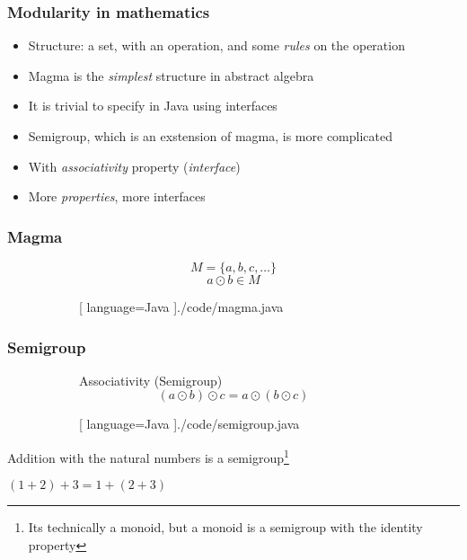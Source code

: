 \begin{frame}
  \frametitle{Modularity in mathematics}
  \begin{itemize}
    \item Structure: a set, with an operation, and some \textit{rules} on the
    operation
    \item Magma is the \textit{simplest} structure in abstract algebra
    \item It is trivial to specify in Java using interfaces
    \item Semigroup, which is an exstension of magma, is more complicated
    \item With \textit{associativity} property (\textit{interface})
    \item More \textit{properties}, more interfaces
  \end{itemize}
\end{frame}

\begin{frame}
  \frametitle{Magma}
  \begin{figure}[H]
    \begin{subfigure}[h]{0.45\textwidth}
      \begin{equation}
        M = \{ a, b, c, \dots \}
      \end{equation}
      \begin{equation}
        a \odot b \in M
      \end{equation}
    \end{subfigure}
    \hfill
    \begin{subfigure}[h]{0.45\textwidth}
      \begin{center}
      
      [ language=Java
      ]{./code/magma.java}
  \end{center}
    \end{subfigure}
  \end{figure}
\end{frame}

\hidelogo

\begin{frame}
  \frametitle{Semigroup}
  \begin{figure}[H]
    \begin{subfigure}[h]{0.45\textwidth}
      Associativity (Semigroup)
      \begin{equation}
        (a \odot b) \odot c = a \odot (b \odot c)
      \end{equation}
    \end{subfigure}
    \hfill
    \begin{subfigure}[h]{0.45\textwidth}
      \begin{center}
        
        [ language=Java
        ]{./code/semigroup.java}
      \end{center}
    \end{subfigure}
  \end{figure}
  Addition with the natural numbers is a semigroup\footnote{Its technically a monoid, but a monoid is a semigroup with the identity property}
      \begin{center}
        $(1 + 2) + 3 = 1 + (2 + 3)$
      \end{center}
\end{frame}

